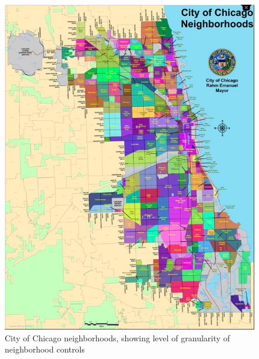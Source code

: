 \begin{figure}
\includegraphics[width=.8\textwidth]{figures/chicago_city_neighborhoods}
\caption[City of Chicago neighborhoods]{City of Chicago neighborhoods, showing level of granularity of neighborhood controls}
\end{figure}
